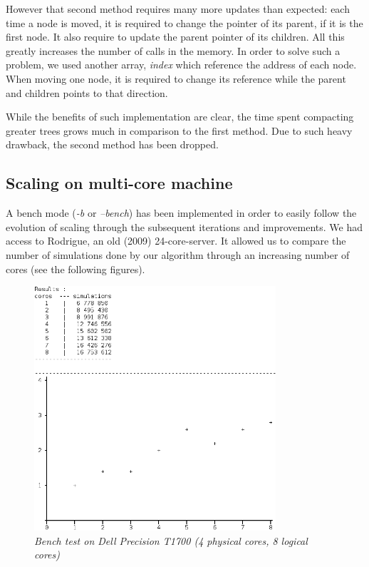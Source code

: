 However that second method requires many more updates than expected: 
each time a node is moved, it is required to change the pointer of its parent, if it is the first node. It also require to update the parent pointer of its children. All this greatly increases the number of calls in the memory. In order to solve such a problem, we used another array, \textit{index} which reference the address of each node. When moving one node, it is required to change its reference while the parent and children points to that direction.

While the benefits of such implementation are clear, the time spent compacting greater trees grows much in comparison to the first method. Due to such heavy drawback, the second method has been dropped.

\subsection{Scaling on multi-core machine}

A bench mode (\textit{-b} or \textit{--bench}) has been implemented in order to easily follow the evolution of scaling through the subsequent iterations and improvements. We had access to Rodrigue, an old (2009) 24-core-server. It allowed us to compare the number of simulations done by our algorithm through an increasing number of cores (see the following figures).

\begin{figure}[H] 
\centerline{\includegraphics[width=0.8\textwidth]{Optimisations/bench_T1700.png}}
\caption{\label{fig:Defrag}\textit{Bench test on Dell Precision T1700 (4 physical cores, 8 logical cores)}}
\end{figure}


